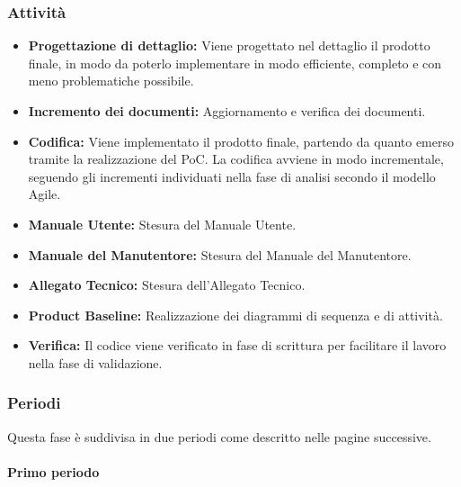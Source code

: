 \subsubsection{Attività}\label{sec:pianificazione:prog_codifica:attivita}
\begin{itemize}
    \item \textbf{Progettazione di dettaglio:} Viene progettato nel dettaglio il prodotto finale, in modo da poterlo implementare in modo efficiente, completo e con meno problematiche possibile. 
    \item \textbf{Incremento dei documenti:} Aggiornamento e verifica dei documenti.
    \item \textbf{Codifica:} Viene implementato il prodotto finale, partendo da quanto emerso tramite la realizzazione del PoC. La codifica avviene in modo incrementale, seguendo gli incrementi individuati nella fase di analisi secondo il modello Agile.
    \item \textbf{Manuale Utente:} Stesura del Manuale Utente.
    \item \textbf{Manuale del Manutentore:} Stesura del Manuale del Manutentore.
    \item \textbf{Allegato Tecnico:} Stesura dell'Allegato Tecnico.
    \item \textbf{Product Baseline:} Realizzazione dei diagrammi di sequenza e di attività.
    \item \textbf{Verifica:} Il codice viene verificato in fase di scrittura per facilitare il lavoro nella fase di validazione.
\end{itemize}

\subsubsection{Periodi}\label{sec:pianificazione:prog_codifica:periodi}
Questa fase è suddivisa in due periodi come descritto nelle pagine successive.

\newpage

\paragraph{Primo periodo}\label{sec:pianificazione:prog_codifica:periodi:primo}

